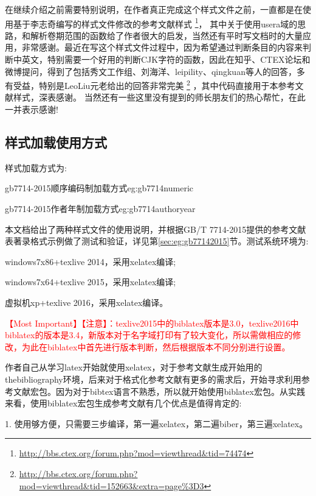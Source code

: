 \documentclass[11pt]{article} %
\begin{document}
在继续介绍之前需要特别说明，在作者真正完成这个样式文件之前，一直都是在使用基于李志奇编写的样式文件修改的参考文献样式
\footnote{\url{http://bbs.ctex.org/forum.php?mod=viewthread&tid=74474}}，
其中关于使用usera域的思路，和解析卷期范围的函数给了作者很大的启发，当然还有平时写文档时的大量应用，非常感谢。最近在写这个样式文件过程中，因为希望通过判断条目的内容来判断中英文，特别需要一个好用的判断CJK字符的函数，因此在知乎、CTEX论坛和微博提问，得到了包括秀文工作组、刘海洋、leipility、qingkuan等人的回答，多有受益，特别是LeoLiu元老给出的回答非常完美
\footnote{\url{http://bbs.ctex.org/forum.php?mod=viewthread&tid=152663&extra=page\%3D3}}
，其中代码直接用于本参考文献样式，深表感谢。 当然还有一些这里没有提到的师长朋友们的热心帮忙，在此一并表示感谢!

\subsection{样式加载使用方式}
样式加载方式为:

\begin{codetex}{gb7714-2015顺序编码制加载方式}{eg:gb7714numeric}
\usepackage[backend=biber,style=gb7714-2015]{biblatex}
\end{codetex}

\begin{codetex}{gb7714-2015作者年制加载方式}{eg:gb7714authoryear}
\usepackage[backend=biber,style=gb7714-2015ay]{biblatex}
\end{codetex}

本文档给出了两种样式文件的使用说明，并根据GB/T 7714-2015提供的参考文献表著录格式示例做了测试和验证，详见第\ref{sec:eg:gb77142015}节。测试系统环境为:

windows7x86+texlive 2014，采用xelatex编译;

windows7x64+texlive 2015，采用xelatex编译;

虚拟机xp+texlive 2016，采用xelatex编译。

\textcolor{red}{\HandRight \heiti 【Most Important】【注意】：texlive2015中的biblatex版本是3.0，texlive2016中biblatex的版本是3.4，新版本对于名字域打印有了较大变化，所以需做相应的修改，为此在biblatex中首先进行版本判断，然后根据版本不同分别进行设置。}

作者自己从学习latex开始就使用xelatex，对于参考文献生成开始用的thebibliography环境，后来对于格式化参考文献有更多的需求后，开始寻求利用参考文献宏包。因为对于bibtex语言不熟悉，所以就开始使用biblatex宏包。从实践来看，使用biblatex宏包生成参考文献有几个优点是值得肯定的:

1. 使用够方便，只需要三步编译，第一遍xelatex，第二遍biber，第三遍xelatex。
\end{document}
